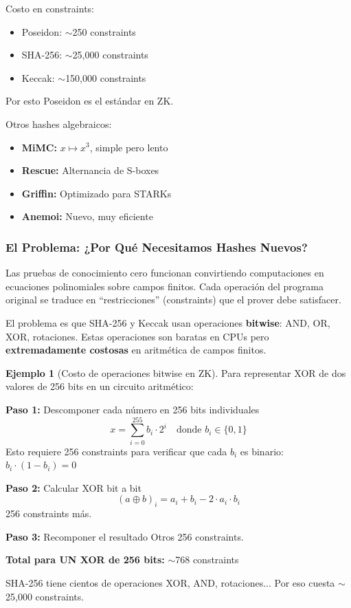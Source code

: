 \documentclass[11pt,a4paper,twoside,openright]{book}
\theoremstyle{definition}
\newtheorem{example}{Ejemplo}[chapter]
\theoremstyle{plain}
\theoremstyle{remark}
\begin{document}
\begin{mathnote}
Costo en constraints:
\begin{itemize}
    \item Poseidon: $\sim$250 constraints
    \item SHA-256: $\sim$25,000 constraints
    \item Keccak: $\sim$150,000 constraints
\end{itemize}
Por esto Poseidon es el estándar en ZK.
\end{mathnote}

Otros hashes algebraicos:
\begin{itemize}
    \item \textbf{MiMC:} $x \mapsto x^3$, simple pero lento
    \item \textbf{Rescue:} Alternancia de S-boxes
    \item \textbf{Griffin:} Optimizado para STARKs
    \item \textbf{Anemoi:} Nuevo, muy eficiente
\end{itemize}

\subsubsection{El Problema: ¿Por Qué Necesitamos Hashes Nuevos?}

\begin{intuicion}
Las pruebas de conocimiento cero funcionan convirtiendo computaciones en ecuaciones polinomiales sobre campos finitos. Cada operación del programa original se traduce en ``restricciones'' (constraints) que el prover debe satisfacer.

El problema es que SHA-256 y Keccak usan operaciones \textbf{bitwise}: AND, OR, XOR, rotaciones. Estas operaciones son baratas en CPUs pero \textbf{extremadamente costosas} en aritmética de campos finitos.
\end{intuicion}

\begin{example}[Costo de operaciones bitwise en ZK]
Para representar XOR de dos valores de 256 bits en un circuito aritmético:

\textbf{Paso 1:} Descomponer cada número en 256 bits individuales
\[ x = \sum_{i=0}^{255} b_i \cdot 2^i \quad \text{donde } b_i \in \{0, 1\} \]
Esto requiere 256 constraints para verificar que cada $b_i$ es binario: $b_i \cdot (1 - b_i) = 0$

\textbf{Paso 2:} Calcular XOR bit a bit
\[ (a \oplus b)_i = a_i + b_i - 2 \cdot a_i \cdot b_i \]
256 constraints más.

\textbf{Paso 3:} Recomponer el resultado
Otros 256 constraints.

\textbf{Total para UN XOR de 256 bits:} $\sim$768 constraints

SHA-256 tiene cientos de operaciones XOR, AND, rotaciones... Por eso cuesta $\sim$25,000 constraints.
\end{example}
\end{document}
